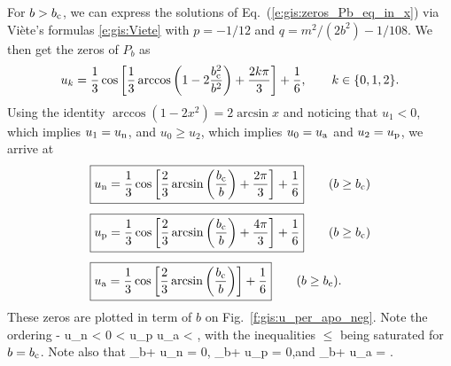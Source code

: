 For $b>b_{\rm c}$, we can express the solutions of Eq.~(\ref{e:gis:zeros_Pb_eq_in_x})
via Viète's formulas \eqref{e:gis:Viete}
with $p = -1/12$ and $q = m^2/(2b^2) - 1/108$.
We then get the zeros of $P_b$ as
\[
    u_k = \frac{1}{3} \cos \left[ \frac{1}{3}
        \arccos \left( 1 - 2 \frac{b_{\rm c}^2}{b^2} \right) + \frac{2 k \pi}{3} \right]
        + \frac{1}{6},
        \qquad k \in \{0, 1, 2\} .
\]
Using the identity $\arccos(1 - 2 x^2) = 2\arcsin x$ and noticing
that $u_1 < 0$, which implies $u_1 = u_{\rm n}$, and $u_ 0 \geq u_2$, which
implies $u_0 = u_{\rm a}$ and $u_2 = u_{\rm p}$,
we arrive at
\begin{subequations}
\label{e:gis:zeros_Pbu}
\begin{align}
  &  \fbox{$\displaystyle u_{\rm n} = \frac{1}{3}\cos\left[ \frac{2}{3} \arcsin\left(
   \frac{b_{\rm c}}{b}\right) + \frac{2\pi}{3}\right] + \frac{1}{6} $} \qquad (b \geq b_{\rm c}) \label{e:gis:u_n_b_gt_bc}\\[1ex]
 & \fbox{$\displaystyle  u_{\rm p} = \frac{1}{3}\cos\left[ \frac{2}{3} \arcsin\left(
   \frac{b_{\rm c}}{b}\right) + \frac{4\pi}{3}\right] + \frac{1}{6} $}
            \qquad (b \geq b_{\rm c}) \label{e:gis:u_per_b}  \\[1ex]
 & \fbox{$\displaystyle  u_{\rm a} = \frac{1}{3}\cos\left[ \frac{2}{3} \arcsin\left(
   \frac{b_{\rm c}}{b}\right) \right] + \frac{1}{6} $}  \qquad (b \geq b_{\rm c}) .
   \label{e:gis:u_apo_b}
\end{align}
\end{subequations}
These zeros are plotted in term of $b$ on Fig.~\ref{f:gis:u_per_apo_neg}.
Note the ordering
\be \label{e:gis:order_u_zeros}
    - \leq u_{\rm n} < 0 < u_{\rm p} \leq {}
    \leq u_{\rm a} <  ,
\ee
with the inequalities $\leq$ being saturated for $b = b_{\rm c}$.
Note also that
\be \label{e:gis:lim_b_inf_u_zeros}
    \lim_{b\to +\infty} u_{\rm n} = 0,\qquad
    \lim_{b\to +\infty} u_{\rm p} = 0,\qquad\mbox{and}\qquad
    \lim_{b\to +\infty} u_{\rm a} =  .
\ee

